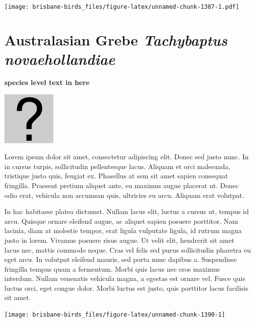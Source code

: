 \documentclass[]{book}
\let\origfigure\figure
\let\endorigfigure\endfigure
\renewenvironment{figure}[1][2] {
  \expandafter\origfigure\expandafter[H]
} {
  \endorigfigure
}
\begin{document}
\begin{figure}
\centering
\texttt{[image: brisbane-birds\_files/figure-latex/unnamed-chunk-1387-1.pdf]}
\caption{\label{fig:unnamed-chunk-1387}insert figure caption}
\end{figure}

\section{\texorpdfstring{Australasian Grebe \emph{Tachybaptus
novaehollandiae}}{Australasian Grebe Tachybaptus novaehollandiae}}\label{australasian-grebe-tachybaptus-novaehollandiae}

\textbf{species level text in here}

\begin{figure}
\centering
\includegraphics{assets/missing.png}
\caption{No image for species}
\end{figure}

Lorem ipsum dolor sit amet, consectetur adipiscing elit. Donec sed justo
nunc. In in cursus turpis, sollicitudin pellentesque lacus. Aliquam et
orci malesuada, tristique justo quis, feugiat ex. Phasellus at sem sit
amet sapien consequat fringilla. Praesent pretium aliquet ante, eu
maximus augue placerat ut. Donec odio erat, vehicula non accumsan quis,
ultricies eu arcu. Aliquam erat volutpat.

In hac habitasse platea dictumst. Nullam lacus elit, luctus a cursus ut,
tempus id arcu. Quisque ornare eleifend augue, ac aliquet sapien posuere
porttitor. Nam lacinia, diam at molestie tempor, erat ligula vulputate
ligula, id rutrum magna justo in lorem. Vivamus posuere risus augue. Ut
velit elit, hendrerit sit amet lacus nec, mattis commodo neque. Cras vel
felis sed purus sollicitudin pharetra eu eget arcu. In volutpat eleifend
mauris, sed porta nunc dapibus a. Suspendisse fringilla tempus quam a
fermentum. Morbi quis lacus nec eros maximus interdum. Nullam venenatis
vehicula magna, a egestas est ornare vel. Fusce quis luctus orci, eget
congue dolor. Morbi luctus est justo, quis porttitor lacus facilisis sit
amet.

\begin{figure}
\texttt{[image: brisbane-birds\_files/figure-latex/unnamed-chunk-1390-1]} \caption{insert figure caption}\label{fig:unnamed-chunk-1390}
\end{figure}
\end{document}
